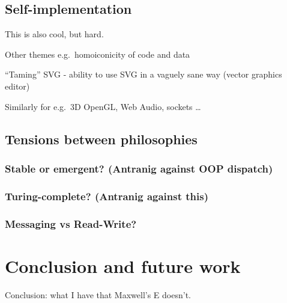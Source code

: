\hypertarget{self-implementation}{%
\subsection{Self-implementation}\label{self-implementation}}

This is also cool, but hard.

Other themes e.g.~homoiconicity of code and data

``Taming'' SVG - ability to use SVG in a vaguely sane way (vector
graphics editor)

Similarly for e.g.~3D OpenGL, Web Audio, sockets \ldots{}

\hypertarget{tensions-between-philosophies}{%
\subsection{Tensions between
philosophies}\label{tensions-between-philosophies}}

\hypertarget{stable-or-emergent-antranig-against-oop-dispatch}{%
\subsubsection{Stable or emergent? (Antranig against OOP
dispatch)}\label{stable-or-emergent-antranig-against-oop-dispatch}}

\hypertarget{turing-complete-antranig-against-this}{%
\subsubsection{Turing-complete? (Antranig against
this)}\label{turing-complete-antranig-against-this}}

\hypertarget{messaging-vs-read-write}{%
\subsubsection{Messaging vs Read-Write?}\label{messaging-vs-read-write}}

\hypertarget{conclusion-and-future-work}{%
\section{Conclusion and future work}\label{conclusion-and-future-work}}

Conclusion: what I have that Maxwell's E doesn't.
